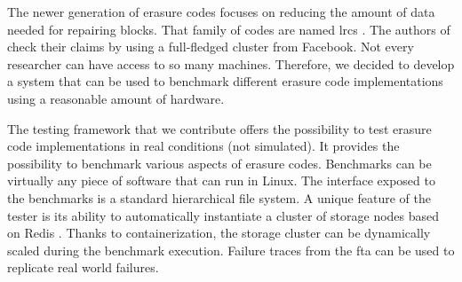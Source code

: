 The newer generation of erasure codes focuses on reducing the amount of data needed for repairing blocks.
That family of codes are named \acp{lrc} \autocite{lrc}.
The authors of \autocite{XorbasVLDB} check their claims by using a full-fledged cluster from Facebook.
Not every researcher can have access to so many machines.
Therefore, we decided to develop a system that can be used to benchmark different erasure code implementations using a reasonable amount of hardware.

The testing framework that we contribute offers the possibility to test erasure code implementations in real conditions (not simulated).
It provides the possibility to benchmark various aspects of erasure codes.
Benchmarks can be virtually any piece of software that can run in Linux.
The interface exposed to the benchmarks is a standard hierarchical file system.
A unique feature of the tester is its ability to automatically instantiate a cluster of storage nodes based on Redis \autocite{redis}.
Thanks to containerization, the storage cluster can be dynamically scaled during the benchmark execution.
Failure traces from the \ac{fta} \autocite{fta-journal,fta-paper} can be used to replicate real world failures.


